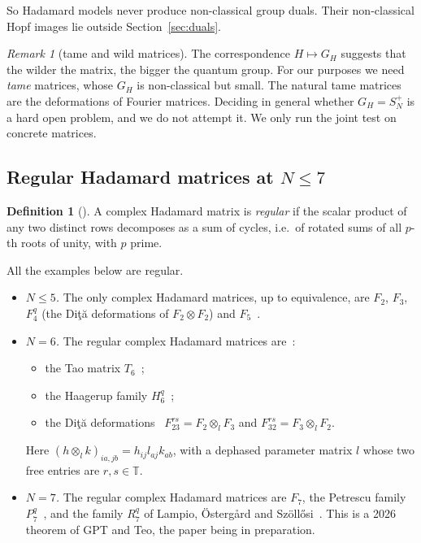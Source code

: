 \documentclass[11pt]{amsart}
\theoremstyle{definition}
\newtheorem{definition}[theorem]{Definition}
\theoremstyle{remark}
\newtheorem{remark}[theorem]{Remark}
\theoremstyle{plain}
\numberwithin{equation}{section}
\numberwithin{table}{section}
\newcommand{\T}{\mathbb T}
\begin{document}
So Hadamard models never produce non-classical group duals. Their non-classical Hopf images lie outside Section~\ref{sec:duals}.

\begin{remark}[tame and wild matrices]
The correspondence $H\mapsto G_H$ suggests that the wilder the matrix, the bigger the quantum group. For our purposes we need \emph{tame} matrices, whose $G_H$ is non-classical but small. The natural tame matrices are the deformations of Fourier matrices. Deciding in general whether $G_H=S_N^+$ is a hard open problem, and we do not attempt it. We only run the joint test on concrete matrices.
\end{remark}

\subsection{Regular Hadamard matrices at $N\le7$}

\begin{definition}[{\cite{bbs}}]
A complex Hadamard matrix is \emph{regular} if the scalar product of any two distinct rows decomposes as a sum of cycles, i.e.\ of rotated sums of all $p$-th roots of unity, with $p$ prime.
\end{definition}

All the examples below are regular.
\begin{itemize}
\item \emph{$N\le5$.} The only complex Hadamard matrices, up to equivalence, are $F_2$, $F_3$, $F_4^q$ (the Di{\c t}{\u a} deformations of $F_2\otimes F_2$) and $F_5$~\cite[Thm.~5.4]{bbs}.
\item \emph{$N=6$.} The regular complex Hadamard matrices are~\cite[Thm.~11.2]{bbs}:
\begin{itemize}
\item the Tao matrix $T_6$~\cite{tao};
\item the Haagerup family $H_6^q$~\cite{ha};
\item the Di{\c t}{\u a} deformations~\cite{di} $F_{23}^{rs}=F_2\otimes_lF_3$ and $F_{32}^{rs}=F_3\otimes_lF_2$.
\end{itemize}
Here $(h\otimes_lk)_{ia,jb}=h_{ij}l_{aj}k_{ab}$, with a dephased parameter matrix $l$ whose two free entries are $r,s\in\T$.
\item \emph{$N=7$.} The regular complex Hadamard matrices are $F_7$, the Petrescu family $P_7^q$~\cite{pe,szo}, and the family $R_7^q$ of Lampio, {\"O}sterg{\aa}rd and Sz{\"o}ll{\H o}si~\cite{los}. This is a 2026 theorem of GPT and Teo, the paper being in preparation.
\end{itemize}
\end{document}
